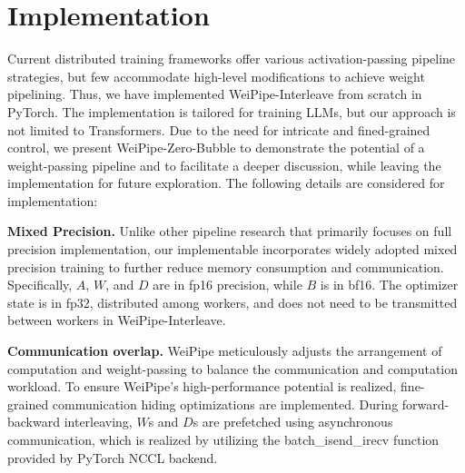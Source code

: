 \documentclass[sigplan,review,anonymous]{acmart}
\begin{document}
\section{Implementation} 

Current distributed training frameworks offer various activation-passing pipeline strategies, but few accommodate high-level modifications to achieve weight pipelining. Thus, we have implemented WeiPipe-Interleave from scratch in PyTorch\cite{pytorch}. The implementation is tailored for training LLMs, but our approach is not limited to Transformers. Due to the need for intricate and fined-grained control, we present WeiPipe-Zero-Bubble to demonstrate the potential of a weight-passing pipeline and to facilitate a deeper discussion, while leaving the implementation for future exploration. The following details are considered for implementation:

\textbf{Mixed Precision.} Unlike other pipeline research that primarily focuses on full precision implementation, our implementable incorporates widely adopted mixed precision training to further reduce memory consumption and communication. Specifically, $A$, $W$, and $D$ are in fp16 precision, while $B$ is in bf16. The optimizer state is in fp32, distributed among workers, and does not need to be transmitted between workers in WeiPipe-Interleave. 



\textbf{Communication overlap.} WeiPipe meticulously adjusts the arrangement of computation and weight-passing to balance the communication and computation workload. To ensure WeiPipe's high-performance potential is realized, fine-grained communication hiding optimizations are implemented. During forward-backward interleaving, $W$s and $D$s are prefetched using asynchronous communication, which is realized by utilizing the batch\_isend\_irecv function provided by PyTorch NCCL backend.
\end{document}
